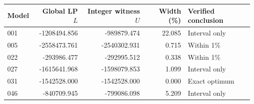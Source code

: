\begin{tabular}{lrrrl}
\toprule
Model & Global LP $L$ & Integer witness $U$ & Width (\%) & Verified conclusion\\
\midrule
001 & -1208494.856 & -989879.474 & 22.085 & Interval only\\
005 & -2558473.761 & -2540302.931 & 0.715 & Within 1\%\\
022 & -293986.477 & -292995.512 & 0.338 & Within 1\%\\
027 & -1615641.968 & -1598079.853 & 1.099 & Interval only\\
031 & -1542528.000 & -1542528.000 & 0.000 & Exact optimum\\
046 & -840709.945 & -799086.098 & 5.209 & Interval only\\
\bottomrule
\end{tabular}
